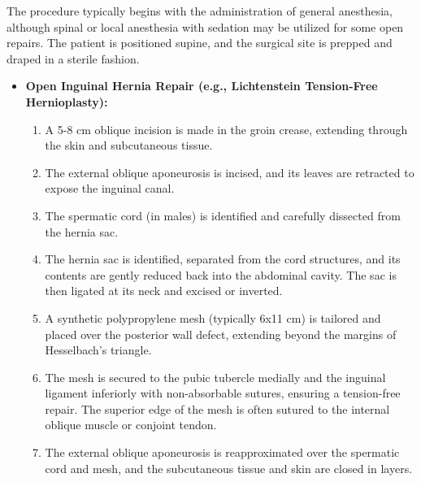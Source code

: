 The procedure typically begins with the administration of general anesthesia, although spinal or local anesthesia with sedation may be utilized for some open repairs. The patient is positioned supine, and the surgical site is prepped and draped in a sterile fashion.

\begin{itemize}
  \item \textbf{Open Inguinal Hernia Repair (e.g., Lichtenstein Tension-Free Hernioplasty):}
  \begin{enumerate}
    \item A 5-8 cm oblique incision is made in the groin crease, extending through the skin and subcutaneous tissue.
    \item The external oblique aponeurosis is incised, and its leaves are retracted to expose the inguinal canal.
    \item The spermatic cord (in males) is identified and carefully dissected from the hernia sac.
    \item The hernia sac is identified, separated from the cord structures, and its contents are gently reduced back into the abdominal cavity. The sac is then ligated at its neck and excised or inverted.
    \item A synthetic polypropylene mesh (typically 6x11 cm) is tailored and placed over the posterior wall defect, extending beyond the margins of Hesselbach's triangle.
    \item The mesh is secured to the pubic tubercle medially and the inguinal ligament inferiorly with non-absorbable sutures, ensuring a tension-free repair. The superior edge of the mesh is often sutured to the internal oblique muscle or conjoint tendon.
    \item The external oblique aponeurosis is reapproximated over the spermatic cord and mesh, and the subcutaneous tissue and skin are closed in layers.
  \end{enumerate}


\end{itemize}

